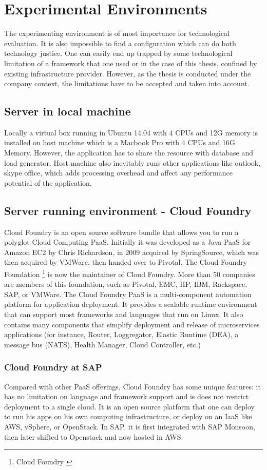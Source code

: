 \chapter{Experimental Environments}

The experimenting environment is of most importance for technological evaluation. It is also impossible to find a configuration which can do both technology justice. One can easily end up trapped by some technological limitation of a framework that one used or in the case of this thesis, confined by existing infrastructure provider. However, as the thesis is conducted under the company context, the limitations have to be accepted and taken into account. 

\section{Server in local machine}
Locally a virtual box running in Ubuntu 14.04 with 4 CPUs and 12G memory is installed on host machine which is a Macbook  Pro with 4 CPUs and 16G Memory. However, the application has to share the resource with database and load generator. Host machine also inevitably runs other applications like outlook, skype office, which adds processing overhead and affect any performance potential of the application. 

\section{Server running environment -  Cloud Foundry}
Cloud Foundry is an open source software bundle that allows you to run a polyglot Cloud Computing \ac{PaaS}. Initially it was developed as a Java \ac{PaaS} for Amazon EC2 by Chris Richardson, in 2009 acquired by SpringSource, which was then acquired by VMWare, then handed over to Pivotal.
The Cloud Foundry Foundation \footnote{Cloud Foundry \citep{Pivotal} } is now the maintainer of Cloud Foundry. More than 50 companies are members of this foundation, such as Pivotal, EMC, HP, IBM, Rackspace, SAP, or VMWare.
The Cloud Foundry PaaS is a multi-component automation platform for application deployment. It provides a scalable runtime environment that can support most frameworks and languages that run on Linux. It also contains many components that simplify deployment and release of microservices applications (for instance, Router, Loggregator, Elastic Runtime (\ac{DEA}), a message bus (NATS), Health Manager, Cloud Controller, etc.)

\subsection{Cloud Foundry at SAP}
Compared with other PaaS offerings, Cloud Foundry has some unique features: it has no limitation on language and framework support and is does not restrict deployment to a single cloud.  It is an open source platform that one can deploy to run his apps on his own computing infrastructure, or deploy on an IaaS like \ac{AWS}, vSphere, or OpenStack. In SAP, it is first integrated with SAP Monsoon, then later shifted to Openstack and now hosted in \ac{AWS}. 

